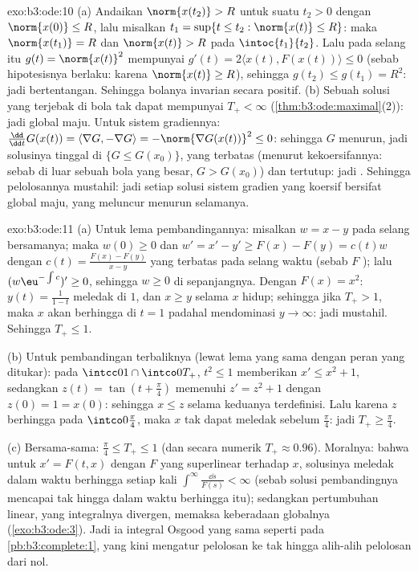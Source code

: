 \begin{solution}{exo:b3:ode:10}
(a) Andaikan $\norm{x(t_2)} > R$ untuk suatu $t_2 > 0$ dengan
$\norm{x(0)} \leq R$, lalu misalkan $t_1 = \sup\{t \leq t_2 :
\norm{x(t)} \leq R\}$: maka $\norm{x(t_1)} = R$ dan
$\norm{x(t)} > R$ pada $\intoc{t_1}{t_2}$. Lalu pada selang itu
$g(t) = \norm{x(t)}^2$ mempunyai $g'(t) = 2\langle x(t),
F(x(t))\rangle \leq 0$ (sebab hipotesisnya berlaku: karena $\norm{x(t)}
\geq R$), sehingga $g(t_2) \leq g(t_1) = R^2$: jadi bertentangan. Sehingga
bolanya invarian secara positif.
(b) Sebuah solusi yang terjebak di bola  tak dapat mempunyai
$T_+ < \infty$ (\cref{thm:b3:ode:maximal}(2)): jadi global
maju. Untuk sistem gradiennya: $\frac{\dd}{\dd t}G(x(t)) =
\langle\nabla G, -\nabla G\rangle = -\norm{\nabla G(x(t))}^2
\leq 0$: sehingga $G$ menurun, jadi solusinya tinggal di $\{G \leq
G(x_0)\}$, yang terbatas (menurut kekoersifannya: sebab di luar sebuah bola
yang besar, $G > G(x_0)$) dan tertutup: jadi . Sehingga pelolosannya
mustahil: jadi setiap solusi sistem gradien yang koersif bersifat
global maju, yang meluncur menurun selamanya.
\end{solution}

\begin{solution}{exo:b3:ode:11}
(a) Untuk lema pembandingannya: misalkan $w = x - y$ pada selang
bersamanya; maka $w(0) \geq 0$ dan $w' = x' - y' \geq F(x) - F(y) =
c(t)w$ dengan $c(t) = \frac{F(x) - F(y)}{x - y}$ yang terbatas pada
selang waktu  (sebab $F$ ); lalu
$(w\eu^{-\int c})' \geq 0$, sehingga $w \geq 0$ di sepanjangnya. Dengan
$F(x) = x^2$: $y(t) = \frac1{1 - t}$ meledak di $1$, dan $x
\geq y$ selama $x$ hidup; sehingga jika $T_+ > 1$, maka $x$ akan
berhingga di $t = 1$ padahal mendominasi $y \to \infty$:
jadi mustahil. Sehingga $T_+ \leq 1$.

(b) Untuk pembandingan terbaliknya (lewat lema yang sama dengan peran yang ditukar):
pada $\intcc01\cap\intco0{T_+}$, $t^2 \leq 1$ memberikan $x' \leq
x^2 + 1$, sedangkan $z(t) = \tan(t + \frac\pi4)$ memenuhi $z' =
z^2 + 1$ dengan $z(0) = 1 = x(0)$: sehingga $x \leq z$ selama
keduanya terdefinisi. Lalu karena $z$ berhingga pada
$\intco0{\frac\pi4}$, maka $x$ tak dapat meledak sebelum
$\frac\pi4$: jadi $T_+ \geq \frac\pi4$.

(c) Bersama-sama: $\frac\pi4 \leq T_+ \leq 1$ (dan secara numerik $T_+
\approx 0.96$). Moralnya: bahwa untuk $x' = F(t, x)$ dengan $F$ yang
superlinear terhadap $x$, solusinya meledak dalam waktu berhingga
setiap kali $\int^\infty\frac{\dd s}{F(s)} < \infty$ (sebab
solusi pembandingnya mencapai tak hingga dalam waktu berhingga itu);
sedangkan pertumbuhan linear, yang integralnya divergen, memaksa keberadaan
globalnya (\cref{exo:b3:ode:3}). Jadi ia integral Osgood yang
sama seperti pada \cref{pb:b3:complete:1}, yang kini mengatur
pelolosan ke tak hingga alih-alih pelolosan dari nol.
\end{solution}

